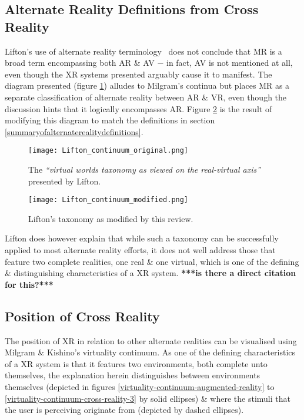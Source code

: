 
\subsection{Alternate Reality Definitions from Cross Reality}

Lifton's use of alternate reality terminology~\cite{Lifton2007a} does not conclude that MR is a broad term encompassing both AR \& AV $-$ in fact, AV is not mentioned at all, even though the XR systems presented arguably cause it to manifest. The diagram presented (figure \ref{original_lifton_axis.png}) alludes to Milgram's continua but places MR as a separate classification of alternate reality between AR \& VR, even though the discussion hints that it logically encompasses AR. Figure \ref{modified_lifton_axis.png} is the result of modifying this diagram to match the definitions in section \ref{summaryofalternaterealitydefinitions}.

\begin{figure}[h]
	\centering
	\texttt{[image: Lifton\_continuum\_original.png]}
	\caption{The \textit{``virtual worlds taxonomy as viewed on the real-virtual axis''} presented by Lifton.}
	\label{original_lifton_axis.png}
\end{figure}

\begin{figure}[h]
	\centering
	\texttt{[image: Lifton\_continuum\_modified.png]}
	\caption{Lifton's taxonomy as modified by this review.}
	\label{modified_lifton_axis.png}
\end{figure}

Lifton does however explain that while such a taxonomy can be successfully applied to most alternate reality efforts, it does not well address those that feature two complete realities, one real \& one virtual, which is one of the defining \& distinguishing characteristics of a XR system. \textbf{***is there a direct citation for this?***}


\subsection{Position of Cross Reality}

The position of XR in relation to other alternate realities can be visualised using Milgram \& Kishino's virtuality continuum. As one of the defining characteristics of a XR system is that it features two environments, both complete unto themselves, the explanation herein distinguishes between environments themselves (depicted in figures \ref{virtuality-continuum-augmented-reality} to \ref{virtuality-continuum-cross-reality-3} by solid ellipses) \& where the stimuli that the user is perceiving originate from (depicted by dashed ellipses).

